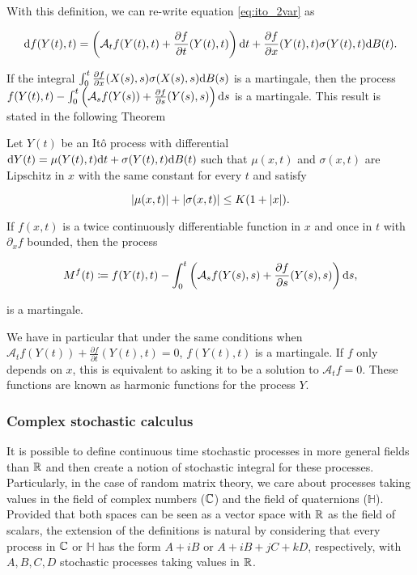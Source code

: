 With this definition, we can re-write equation \eqref{eq:ito_2var} as

\begin{equation*}
    \mathrm d f (Y(t),t) = \left( \mathcal A_t f(Y(t),t) + \frac{\partial f}{\partial t}(Y(t),t) \right) \mathrm d t + \frac{\partial f}{\partial x}(Y(t),t)\sigma(Y(t),t) \mathrm d B(t).
\end{equation*}

If the integral $\int_0^t \frac{\partial f}{\partial x}(X(s),s)\sigma(X(s),s) \mathrm d B(s)$ is a martingale, then the process $f(Y(t),t) - \int_0^t \left( \mathcal A_s f(Y(s)) + \frac{\partial f}{\partial s}(Y(s),s) \right) \mathrm d s$ is a martingale. This result is stated in the following Theorem

\begin{theorem}
    Let $Y(t)$ be an Itô process with differential $\mathrm d Y(t) = \mu(Y(t),t) \mathrm d t + \sigma(Y(t),t)\mathrm d B(t)$ such that $\mu(x,t)$ and $\sigma(x,t)$ are Lipschitz in $x$ with the same constant for every $t$ and satisfy

    \begin{equation*}
        \lvert \mu(x,t) \rvert + \lvert \sigma(x,t) \rvert \le K(1 + \lvert x \rvert).
    \end{equation*}

    If $f(x,t)$ is a twice continuously differentiable function in $x$ and once in $t$ with $\partial_x f$ bounded, then the process 

    \begin{equation*}
        M^f(t) \coloneqq f(Y(t),t) - \int_0^t \left( \mathcal A_s f(Y(s),s) + \frac{\partial f}{\partial s}(Y(s),s) \right) \mathrm d s,
    \end{equation*}

    \noindent is a martingale.
\end{theorem}

We have in particular that under the same conditions when $\mathcal A_t f(Y(t)) + \frac{\partial f}{\partial t}(Y(t),t) = 0$, $f(Y(t),t)$ is a martingale. If $f$ only depends on $x$, this is equivalent to asking it to be a solution to $\mathcal A_t f = 0$. These functions are known as harmonic functions for the process $Y$.


\subsubsection{Complex stochastic calculus}


It is possible to define continuous time stochastic processes in more general fields than $\mathbb R$ and then create a notion of stochastic integral for these processes. Particularly, in the case of random matrix theory, we care about processes taking values in the field of complex numbers ($\mathbb C$) and the field of quaternions ($\mathbb H$). Provided that both spaces can be seen as a vector space with $\mathbb R$ as the field of scalars, the extension of the definitions is natural by considering that every process in $\mathbb C$ or $\mathbb H$ has the form $A + i B$ or $A + i B + j C + k D$, respectively, with $A, B, C, D$ stochastic processes taking values in $\mathbb R$.

